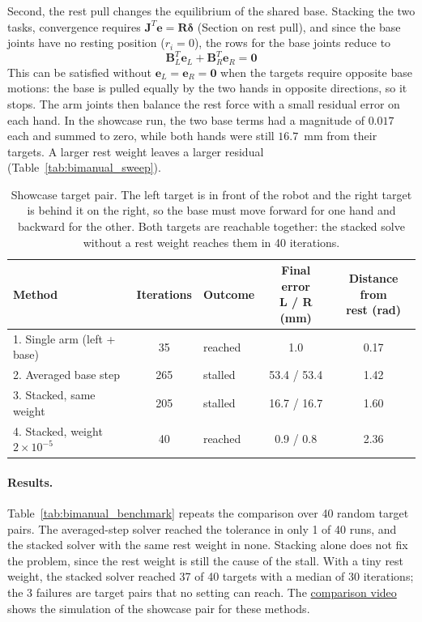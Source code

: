 \documentclass[12pt,a4paper]{article}
\begin{document}
Second, the rest pull changes the equilibrium of the shared base. Stacking the
two tasks, convergence requires $\mathbf{J}^{T}\mathbf{e}=\mathbf{R}\boldsymbol{\delta}$
(Section on rest pull), and since the base joints have no resting position
($r_i=0$), the rows for the base joints reduce to
\begin{equation}
    \mathbf{B}_L^{T}\mathbf{e}_L + \mathbf{B}_R^{T}\mathbf{e}_R = \mathbf{0}
\end{equation}
This can be satisfied without $\mathbf{e}_L=\mathbf{e}_R=\mathbf{0}$ when the targets
require opposite base motions: the base is pulled equally by the two hands in
opposite directions, so it stops. The arm joints then balance the rest force
with a small residual error on each hand. In the showcase run, the two base
terms had a magnitude of $0.017$ each and summed to zero, while both hands
were still $16.7$~mm from their targets. A larger rest weight leaves a larger
residual (Table~\ref{tab:bimanual_sweep}).

\begin{table}[htbp]
    \centering
    \small
    \setlength{\tabcolsep}{5pt}
    \begin{tabular}{l c l c c}
        \hline
        Method & Iterations & Outcome &
        \shortstack{Final error\\L / R (mm)} &
        \shortstack{Distance from\\rest (rad)} \\
        \hline
        1. Single arm (left + base) & 35 & reached & 1.0 & 0.17 \\
        2. Averaged base step & 265 & stalled & 53.4 / 53.4 & 1.42 \\
        3. Stacked, same weight & 205 & stalled & 16.7 / 16.7 & 1.60 \\
        4. Stacked, weight $2\times10^{-5}$ & 40 & reached & 0.9 / 0.8 & 2.36 \\
        \hline
    \end{tabular}
    \caption{\small{Showcase target pair. The left target is in front of the robot and the right target is behind it on the right, so the base must move forward for one hand and backward for the other. Both targets are reachable together: the stacked solve without a rest weight reaches them in 40 iterations.}}
    \label{tab:bimanual_showcase}
\end{table}

\paragraph*{Results.}
Table~\ref{tab:bimanual_benchmark} repeats the comparison over 40 random target
pairs. The averaged-step solver reached the tolerance in only 1 of 40
runs, and the stacked solver with the same rest weight in none. Stacking alone
does not fix the problem, since the rest weight is still the cause of the
stall. With a tiny rest weight, the stacked solver reached 37 of 40 targets with
a median of 30 iterations; the 3 failures are target pairs that no setting can
reach. The \textcolor{blue}{\href{https://youtu.be/Ey7bL1Zsx1M}{comparison video}} shows the simulation of the
showcase pair for these methods.
\end{document}
